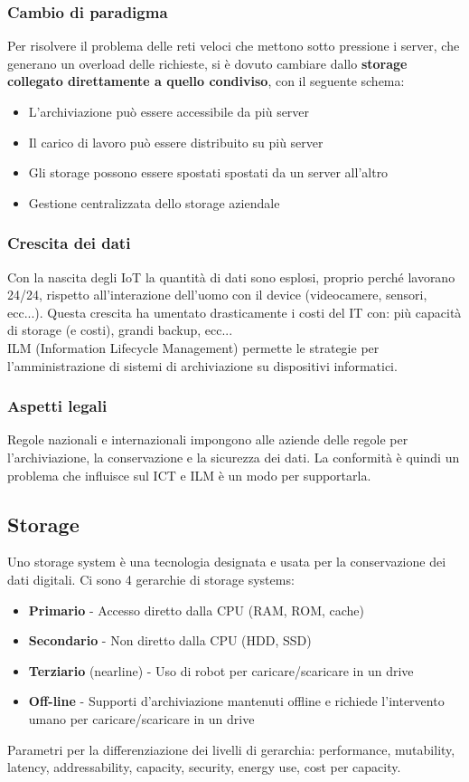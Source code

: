 \documentclass[8pt,a4paper]{extarticle}
\begin{document}
\begin{multicols*}{4}
		\subsubsection{Cambio di paradigma}
		Per risolvere il problema delle reti veloci che mettono sotto pressione i server, che generano un overload delle richieste, si è dovuto cambiare dallo \textbf{storage collegato direttamente a quello condiviso}, con il seguente schema:
		\begin{itemize}
			\item L'archiviazione può essere accessibile da più server
			\item Il carico di lavoro può essere distribuito su più server
			\item Gli storage possono essere spostati spostati da un server all'altro
			\item Gestione centralizzata dello storage aziendale 
		\end{itemize}
		
		\subsubsection{Crescita dei dati}
		Con la nascita degli IoT la quantità di dati sono esplosi, proprio perché lavorano 24/24, rispetto all'interazione dell'uomo con il device (videocamere, sensori, ecc...). Questa crescita ha umentato drasticamente i costi del IT con: più capacità di storage (e costi), grandi backup, ecc... \\ ILM (Information Lifecycle Management) permette le strategie per l'amministrazione di sistemi di archiviazione su dispositivi informatici.
		\subsubsection{Aspetti legali}
	 	Regole nazionali e internazionali impongono alle aziende delle regole per l'archiviazione, la conservazione e la sicurezza dei dati. La conformità è quindi un problema che influisce sul ICT e ILM è un modo per supportarla.
	 	
	 	\subsection{Storage}
	 	Uno storage system è una tecnologia designata e usata per la conservazione dei dati digitali. Ci sono 4 gerarchie di storage systems:
	 	\begin{itemize}
	 		\item \textbf{Primario} - Accesso diretto dalla CPU (RAM, ROM, cache)
	 		\item \textbf{Secondario} - Non diretto dalla CPU (HDD, SSD)
	 		\item \textbf{Terziario} (nearline) - Uso di robot per caricare/scaricare in un drive
	 		\item \textbf{Off-line} - Supporti d'archiviazione mantenuti offline e richiede l'intervento umano per caricare/scaricare in un drive
	 	\end{itemize}
	 	Parametri per la differenziazione dei livelli di gerarchia: performance, mutability, latency, addressability, capacity, security, energy use, cost per capacity.

\end{multicols*}
\end{document}
